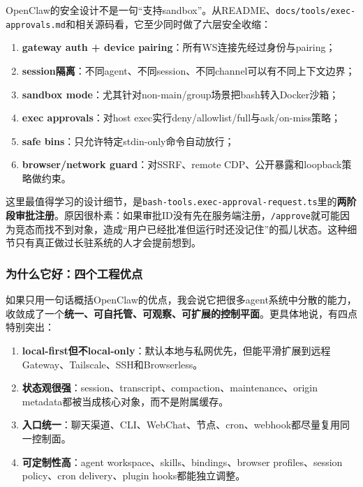 \documentclass[12pt,a4paper]{article}
\begin{document}
OpenClaw的安全设计不是一句“支持sandbox”。从README、\texttt{docs/tools/exec-approvals.md}和相关源码看，它至少同时做了六层安全收缩：

\begin{enumerate}
    \item \textbf{gateway auth + device pairing}：所有WS连接先经过身份与pairing；
    \item \textbf{session隔离}：不同agent、不同session、不同channel可以有不同上下文边界；
    \item \textbf{sandbox mode}：尤其针对non-main/group场景把bash转入Docker沙箱；
    \item \textbf{exec approvals}：对host exec实行deny/allowlist/full与ask/on-miss策略；
    \item \textbf{safe bins}：只允许特定stdin-only命令自动放行；
    \item \textbf{browser/network guard}：对SSRF、remote CDP、公开暴露和loopback策略做约束。
\end{enumerate}

这里最值得学习的设计细节，是\texttt{bash-tools.exec-approval-request.ts}里的\textbf{两阶段审批注册}。原因很朴素：如果审批ID没有先在服务端注册，\texttt{/approve}就可能因为竞态而找不到对象，造成“用户已经批准但运行时还没记住”的孤儿状态。这种细节只有真正做过长驻系统的人才会提前想到。

\subsubsection{为什么它好：四个工程优点}

如果只用一句话概括OpenClaw的优点，我会说它把很多agent系统中分散的能力，收敛成了一个\textbf{统一、可自托管、可观察、可扩展的控制平面}。更具体地说，有四点特别突出：

\begin{enumerate}
    \item \textbf{local-first但不local-only}：默认本地与私网优先，但能平滑扩展到远程Gateway、Tailscale、SSH和Browserless。
    \item \textbf{状态观很强}：session、transcript、compaction、maintenance、origin metadata都被当成核心对象，而不是附属缓存。
    \item \textbf{入口统一}：聊天渠道、CLI、WebChat、节点、cron、webhook都尽量复用同一控制面。
    \item \textbf{可定制性高}：agent workspace、skills、bindings、browser profiles、session policy、cron delivery、plugin hooks都能独立调整。
\end{enumerate}
\end{document}
